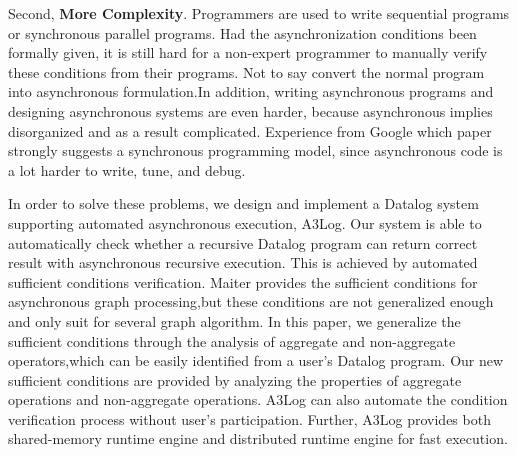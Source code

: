 Second, \textbf{More Complexity}. Programmers are used to write sequential programs or synchronous parallel programs. Had the asynchronization conditions been formally given, it is still hard for a non-expert programmer to manually verify these conditions from their programs. Not to say convert the normal program into asynchronous formulation.In addition, writing asynchronous programs and designing asynchronous systems are even harder, because asynchronous implies disorganized and as a result complicated. Experience from Google \cite{}{\color{red}which paper} strongly suggests a synchronous programming model, since asynchronous code is a lot harder to write, tune, and debug.




In order to solve these problems, we design and implement a Datalog system supporting automated asynchronous execution, A3Log. Our system is able to automatically check whether a recursive Datalog program can return correct result with asynchronous recursive execution. This is achieved by automated sufficient conditions verification. Maiter \cite{maiter} provides the sufficient conditions for asynchronous graph processing,but these conditions are not generalized enough and only suit for several graph algorithm. In this paper, we generalize the sufficient conditions through the analysis of aggregate and non-aggregate operators,which can be easily identified from a user's Datalog program. %
Our new sufficient conditions are provided by analyzing the properties of aggregate operations and non-aggregate operations. A3Log can also automate the condition verification process without user's participation. Further, A3Log provides both shared-memory runtime engine and distributed runtime engine for fast execution.

